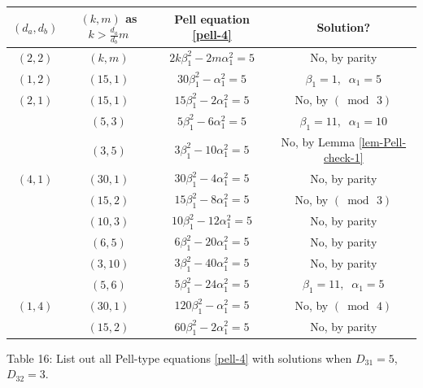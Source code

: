 \documentclass[12pt]{article}
\begin{document}
\begin{center}
\begin{tabular}{|c|c|c|c|}
\hline $(d_a, d_b)$ & $(k, m)$ as $k > \frac{d_a}{d_b} m$ & Pell equation \eqref{pell-4} & Solution? \\
\hline $(2,2)$ & $(k,m)$ & $2 k \beta_1^2-2 m \alpha_1^2=5$ & No, by parity \\
\hline $(1,2)$ & $(15,1)$ & $30\beta_1^2-\alpha_1^2=5$ & $\beta_1=1, \; \; \alpha_1=5$\\
\hline $(2,1)$ & $(15,1)$ & $15\beta_1^2-2\alpha_1^2=5$ & No, by $(\bmod \, 3)$\\
\hline & $(5,3)$ & $5\beta_1^2-6\alpha_1^2=5$ & $\beta_1=11, \; \; \alpha_1=10$\\
\hline & $(3,5)$ & $3\beta_1^2-10\alpha_1^2=5$ & No, by Lemma \ref{lem-Pell-check-1} \\
\hline $(4,1)$ & $(30,1)$ & $30\beta_1^2-4\alpha_1^2=5$ & No, by parity\\
\hline & $(15,2)$ & $15\beta_1^2-8\alpha_1^2=5$ & No, by $(\bmod \, 3)$\\
\hline & $(10,3)$ & $10\beta_1^2-12\alpha_1^2=5$ & No, by parity\\
\hline & $(6,5)$ & $6\beta_1^2-20\alpha_1^2=5$ & No, by parity\\
\hline & $(3,10)$ & $3\beta_1^2-40\alpha_1^2=5$ & No, by parity\\
\hline & $(5,6)$ & $5\beta_1^2-24\alpha_1^2=5$ & $\beta_1=11, \; \; \alpha_1=5$\\
\hline $(1,4)$ & $(30,1)$ & $120\beta_1^2-\alpha_1^2=5$ & No, by $(\bmod \, 4)$\\
\hline & $(15,2)$ & $60\beta_1^2-2\alpha_1^2=5$ & No, by parity\\
\hline
\end{tabular}
\newline \small{Table 16: List out all Pell-type equations \eqref{pell-4} with solutions when $D_{31} = 5$, $D_{32} = 3$.}
\end{center}

\end{document}
